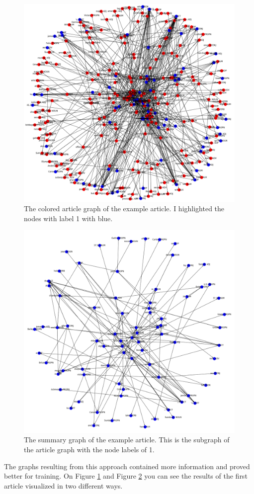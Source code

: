 \begin{figure}[!ht]
	\centering
	\includegraphics[width=150mm, keepaspectratio]{figures/usain_bolt_colored.png}
	\caption{The colored article graph of the example article. I highlighted the nodes with label 1 with blue.}
	\label{fig:usain_article_graph_colored}
\end{figure}

\begin{figure}[!ht]
	\centering
	\includegraphics[width=150mm, keepaspectratio]{figures/usain_bolt_summary.png}
	\caption{The summary graph of the example article. This is the subgraph of the article graph with the node labels of 1.}
	\label{fig:usain_summary_graph}
\end{figure}

The graphs resulting from this approach contained more information and proved better for training. On Figure \ref{fig:usain_article_graph_colored} and Figure \ref{fig:usain_summary_graph} you can see the results of the first article visualized in two different ways.
